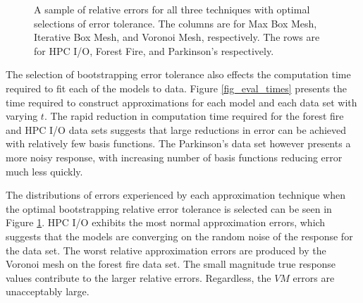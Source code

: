 \documentclass[smallextended]{svjour3}       %
\begin{document}
\begin{figure}
  \caption{A sample of relative errors for all three techniques with optimal selections of error tolerance. The columns are for Max Box Mesh, Iterative Box Mesh, and Voronoi Mesh, respectively. The rows are for HPC I/O, Forest Fire, and Parkinson's respectively.
    \vspace{-.3cm}}
  \label{fig_perf_sample}
\end{figure}

The selection of bootstrapping error tolerance also effects the computation time required to fit each of the models to data. Figure \ref{fig_eval_times} presents the time required to construct approximations for each model and each data set with varying $t$. The rapid reduction in computation time required for the forest fire and HPC I/O data sets suggests that large reductions in error can be achieved with relatively few basis functions. The Parkinson's data set however presents a more noisy response, with increasing number of basis functions reducing error much less quickly.

The distributions of errors experienced by each approximation technique when the optimal bootstrapping relative error tolerance is selected can be seen in Figure \ref{fig_perf_sample}. HPC I/O exhibits the most normal approximation errors, which suggests that the models are converging on the random noise of the response for the data set. The worst relative approximation errors are produced by the Voronoi mesh on the forest fire data set. The small magnitude true response values contribute to the larger relative errors. Regardless, the $VM$ errors are unacceptably large.
\end{document}
